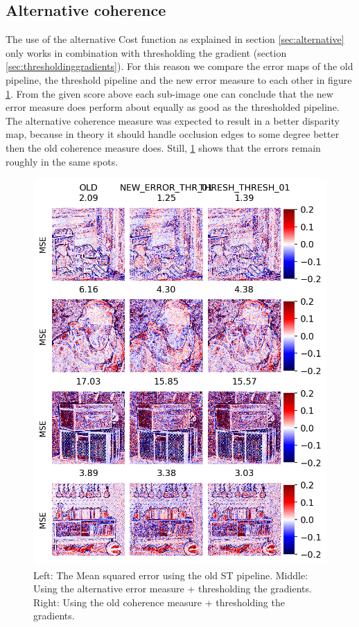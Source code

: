 \documentclass  [
  paper    = a4,
  BCOR     = 10mm,
  twoside,
  fontsize = 12pt,
  fleqn,
  toc      = bibnumbered,
  toc      = listofnumbered,
  numbers  = noendperiod,
  headings = normal,
  listof   = leveldown,
  version  = 3.03
]                                       {scrreprt}
\begin{document}
\subsection{Alternative coherence}
The use of the alternative Cost function as explained in section \ref{sec:alternative} only works in combination with thresholding the gradient (section \ref{sec:thresholdinggradients}). For this reason we compare the error maps of the old pipeline, the threshold pipeline and the new error measure to each other in figure \ref{fig:threshvsoldvsnewerror}. From the given score above each sub-image one can conclude that the new error measure does perform about equally as good as the thresholded pipeline. The alternative coherence measure was expected to result in a better disparity map, because in theory it should handle occlusion edges to some degree better then the old coherence measure does. Still, \ref{fig:threshvsoldvsnewerror} shows that the errors remain roughly in the same spots.


\begin{figure}
	\centering
	\includegraphics[width=0.7\linewidth]{images/thresh_vs_old_vs_newerror}
	\caption[Comparing alternative coherence to new coherence]{Left: The Mean squared error using the old ST pipeline. Middle: Using the alternative error measure + thresholding the gradients. Right: Using the old coherence measure + thresholding the gradients.}
	\label{fig:threshvsoldvsnewerror}
\end{figure}
\end{document}
